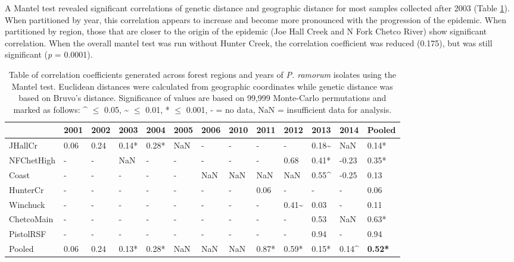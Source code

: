 \documentclass[double,12pt]{beavtex}
\begin{document}
  A Mantel test revealed significant correlations of genetic distance and
  geographic distance for most samples collected after 2003 (Table
  \ref{tab:ramorum3}). When partitioned by year, this correlation appears
  to increase and become more pronounced with the progression of the
  epidemic. When partitioned by region, those that are closer to the
  origin of the epidemic (Joe Hall Creek and N Fork Chetco River) show
  significant correlation. When the overall mantel test was run without
  Hunter Creek, the correlation coefficient was reduced (0.175), but was
  still significant (\emph{p} = 0.0001).
  
  \begin{table}
  \centering
  \caption[Table of correlation coefficients generated across
  forest regions and years of \emph{P. ramorum} isolates using the Mantel
  test.]{Table of correlation coefficients generated across
  forest regions and years of \emph{P. ramorum} isolates using the Mantel
  test. Euclidean distances were calculated from geographic coordinates
  while genetic distance was based on Bruvo's distance. Significance of
  values are based on 99,999 Monte-Carlo permutations and marked as
  follows: \^{} $\leq$ 0.05, \~{} $\leq$ 0.01, * $\leq$ 0.001, - = no data, NaN =
  insufficient data for analysis.}
  \label{tab:ramorum3}
  \begin{tabular}{@{}lllllllllllll@{}}
  \toprule
  & \textbf{2001} & \textbf{2002} & \textbf{2003} & \textbf{2004} &
  \textbf{2005} & \textbf{2006} & \textbf{2010} & \textbf{2011} &
  \textbf{2012} & \textbf{2013} & \textbf{2014} &
  \textbf{Pooled}\tabularnewline
  \midrule
  JHallCr & 0.06 & 0.24 & 0.14* & 0.28* & NaN & - & - & - & - & 0.18\~{}
  & NaN & 0.14*\tabularnewline
  NFChetHigh & - & - & NaN & - & - & - & - & - & 0.68 & 0.41* & -0.23 &
  0.35*\tabularnewline
  Coast & - & - & - & - & - & NaN & NaN & NaN & NaN & 0.55\^{} & -0.25 &
  0.13\tabularnewline
  HunterCr & - & - & - & - & - & - & - & 0.06 & - & - & - &
  0.06\tabularnewline
  Winchuck & - & - & - & - & - & - & - & - & 0.41\~{} & 0.03 & - &
  0.11\tabularnewline
  ChetcoMain & - & - & - & - & - & - & - & - & - & 0.53 & NaN &
  0.63*\tabularnewline
  PistolRSF & - & - & - & - & - & - & - & - & - & 0.94 & - &
  0.94\tabularnewline
  Pooled & 0.06 & 0.24 & 0.13* & 0.28* & NaN & NaN & NaN & 0.87* &
  0.59* & 0.15* & 0.14\^{} & \textbf{0.52*}\tabularnewline
  \bottomrule
  \end{tabular}
  \end{table}
  
\end{document}
